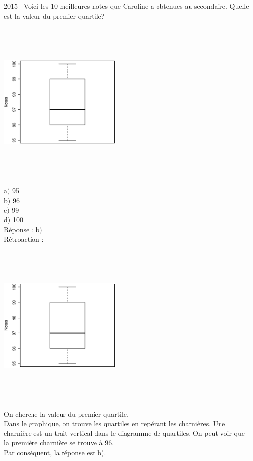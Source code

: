 \documentclass[letterpaper, 12pt]{article}
\begin{document}
2015-- Voici les 10 meilleures notes que Caroline a obtenues au secondaire. Quelle est la valeur du premier quartile?
\begin{center}
 \includegraphics[width=6cm,height=8cm,angle=-90]{Q2015.eps}
\end{center}


a$)$ 95\\
b$)$ 96\\
c$)$ 99\\
d$)$ 100\\

R\'eponse : b$)$\\

R\'etroaction :
\begin{center}
 \includegraphics[width=6cm,height=8cm,angle=-90]{Q2015.eps}
\end{center}
On cherche la valeur du premier quartile.\\
Dans le graphique, on trouve les quartiles en rep\'erant les charni\`eres. Une charni\`ere est un trait vertical dans le diagramme de quartiles. On peut voir que la premi\`ere charni\`ere se trouve \`a 96. \\
Par cons\'equent, la r\'eponse est b).\\
\end{document}
